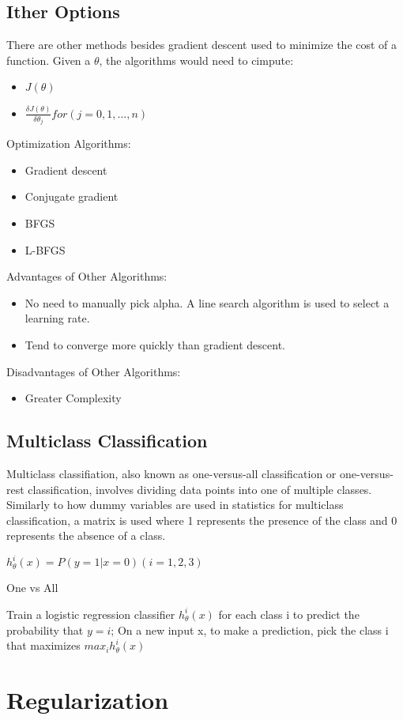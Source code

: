 \documentclass[12pt, twoside, a4paper]{book}
\begin{document}
\section{Ither Options}
There are other methods besides gradient descent used to minimize the cost of a function.
Given a $\theta$, the algorithms would need to cimpute:
\begin{itemize}
  \item $J(\theta)$
  \item $\frac{\delta J(\theta)}{\delta \theta_j} for (j=0,1,...,n)$
\end{itemize}
Optimization Algorithms:
\begin{itemize}
\item Gradient descent
\item Conjugate gradient
\item BFGS
\item L-BFGS
\end{itemize}
Advantages of Other Algorithms:
\begin{itemize}
\item No need to manually pick alpha. A line search algorithm is used to select a learning rate.
\item Tend to converge more quickly than gradient descent.
\end{itemize}
Disadvantages of Other Algorithms:
\begin{itemize}
\item Greater Complexity
\end{itemize}
\section{Multiclass Classification}
Multiclass classifiation, also known as one-versus-all classification or one-versus-rest classification, involves dividing data points into one of multiple classes. Similarly to how dummy variables are used in statistics for multiclass classification, a matrix is used where 1 represents the presence of the class and 0 represents the absence of a class.

$h_{\theta}^i(x)=P(y=1|x=0) (i=1,2,3)$

One vs All

Train a logistic regression classifier $h_{\theta}^i(x)$ for each class i to predict the probability that $y=i$;
On a new input x, to make a prediction, pick the class i that maximizes $max_i h_{\theta}^i(x)$

\chapter{Regularization}
\end{document}
